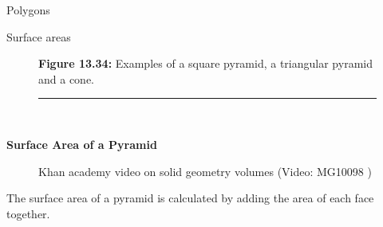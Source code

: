 \begin{exercises}{Polygons}
\begin{exercises}{Surface areas }
\begin{figure}[H]
\begin{center}
      \vspace{2pt}
    \vspace{\rubberspace}\par \begin{cnxcaption}
	  \small \textbf{Figure 13.34: }Examples of a square pyramid, a triangular pyramid and a cone.
	\end{cnxcaption}
      
    \vspace{.1in}
    \rule[.1in]{\figurerulewidth}{.005in} \\
        
    \end{center}

 \end{figure}   

    \addtocounter{footnote}{-0}
    
      \label{m39357*id62647}
        \textbf{Surface Area of a Pyramid}
      \par 
      \label{m39357*eip-485}
    \setcounter{subfigure}{0}


	\begin{figure}[H] %
    
    
    \textnormal{Khan academy video on solid geometry volumes}\vspace{.1in} \nopagebreak
  \label{m39357*yt-media1}\label{m39357*yt-video1}
             { (Video:  MG10098 )}
      
      \vspace{2pt}
    \vspace{.1in}
    
    

 \end{figure}   

    \addtocounter{footnote}{-0}
    \par \label{m39357*id62653}The surface area of a pyramid is calculated by adding the area of each face together.\par 
\label{m39357*secfhsst!!!underscore!!!id97}\vspace{.5cm} 
      

\end{exercises}
\end{exercises}
